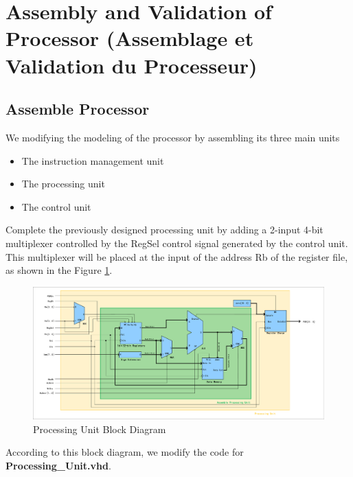 \section{Assembly and Validation of Processor 
(Assemblage et Validation du Processeur)}

\subsection{Assemble Processor}
\label{sec:Assemble Processor}

We modifying the modeling of the processor by assembling its three main units
\begin{itemize}
    \item The instruction management unit
    \item The processing unit
    \item The control unit
\end{itemize}

Complete the previously designed processing unit by adding a
2-input 4-bit multiplexer controlled by the RegSel control signal
generated by the control unit. This multiplexer will be placed at the input of the address
Rb of the register file, as shown in the Figure \ref{fig:AsmbUTf}.

\begin{figure}[htp]
    \centering
    \includegraphics[width=1.5\textwidth, angle = 270]{picture/AsmbUTf.pdf}
    \caption{Processing Unit Block Diagram}     
    \label{fig:AsmbUTf}
\end{figure}

According to this block diagram, we modify the code for \textbf{Processing\_Unit.vhd}.

